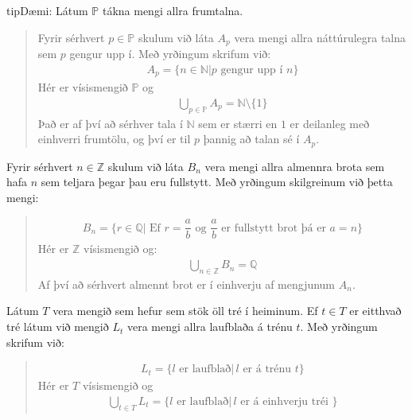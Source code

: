 \documentclass[a4paper,10pt,icelandic]{sphinxmanual}
\begin{document}
\begin{sphinxadmonition}{tip}{Dæmi:}
 Látum \(\mathbb{P}\) tákna mengi allra frumtalna.
\begin{quote}

Fyrir sérhvert \(p\in\mathbb{P}\) skulum við láta \(A_p\) vera mengi allra náttúrulegra talna sem \(p\) gengur upp í. Með yrðingum skrifum við:
\begin{equation*}
\begin{split}A_p=\{n\in\mathbb{N}|p\text{ gengur upp í }n \}\end{split}
\end{equation*}
Hér er vísismengið \(\mathbb{P}\) og
\begin{equation*}
\begin{split}\bigcup_{p\in\mathbb{P}}A_p=\mathbb{N}\setminus\{1\}\end{split}
\end{equation*}
Það er af því að sérhver tala í \(\mathbb{N}\) sem er stærri en \(1\) er deilanleg með einhverri frumtölu, og því er til \(p\) þannig að talan sé í \(A_p\).
\end{quote}

 Fyrir sérhvert \(n\in \mathbb{Z}\) skulum við láta \(B_n\) vera mengi allra almennra brota sem hafa \(n\) sem teljara þegar þau eru fullstytt. Með yrðingum skilgreinum við þetta mengi:
\begin{quote}
\begin{equation*}
\begin{split}B_n=\{r\in\mathbb{Q}|\,\, \text{Ef }r=\dfrac{a}{b}\text{ og } \dfrac{a}{b}\text{ er fullstytt brot þá er }a=n \}\end{split}
\end{equation*}
Hér er \(\mathbb{Z}\) vísismengið og:
\begin{equation*}
\begin{split}\bigcup_{n\in\mathbb{Z}}B_n=\mathbb{Q}\end{split}
\end{equation*}
Af því að sérhvert almennt brot er í einhverju af mengjunum \(A_n\).
\end{quote}

 Látum \(T\) vera mengið sem hefur sem stök öll tré í heiminum. Ef \(t\in T\) er eitthvað tré látum við mengið \(L_t\) vera mengi allra laufblaða á trénu \(t\). Með yrðingum skrifum við:
\begin{quote}
\begin{equation*}
\begin{split}L_t=\{l\text{ er laufblað}|\, l\text{ er á trénu }t \}\end{split}
\end{equation*}
Hér er \(T\) vísismengið og
\begin{equation*}
\begin{split}\bigcup_{t\in T}L_t=\{l\text{ er laufblað}|\, l\text{ er á einhverju tréi } \}\end{split}
\end{equation*}\end{quote}
\end{sphinxadmonition}
\end{document}
